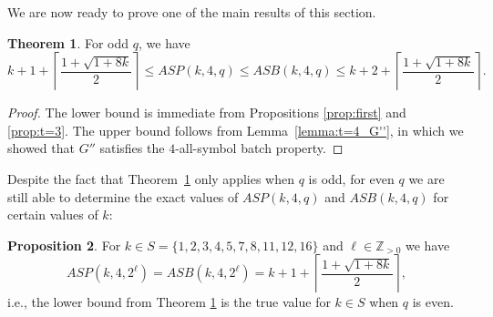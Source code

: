 \documentclass[11pt,a4paper]{article}
\theoremstyle{definition}
\newtheorem{theorem}{Theorem}
\newtheorem{proposition}[theorem]{Proposition}
\newcommand{\Z}{\mathbb{Z}}
\begin{document}
We are now ready to prove one of the main results of this section.

\begin{theorem} \label{thm:t=4} 
    For odd $q$, we have
    $$
        k+1 + \left\lceil \frac{1 + \sqrt{1 + 8k}}{2}\right\rceil \leq ASP(k,4,q) \leq ASB(k,4,q) \leq k+2 + \left\lceil \frac{1 + \sqrt{1 + 8k}}{2}\right\rceil.
    $$
\end{theorem}


\begin{proof}
    The lower bound is immediate from Propositions \ref{prop:first} and \ref{prop:t=3}. The upper bound follows from Lemma~\ref{lemma:t=4_G''}, in which we showed that \(G''\) satisfies the \(4\)-all-symbol batch property.
\end{proof}

Despite the fact that Theorem~\ref{thm:t=4} only applies when $q$ is odd, for even $q$ we are still able to determine the exact values of $ASP(k,4,q)$ and $ASB(k,4,q)$ for certain values of $k$:

\begin{proposition} \label{prop:t=4_q=2} 
    For $k \in S =\{1,2,3,4,5,7,8,11,12,16\}$ and $\ell \in \Z_{>0}$ we have 
    $$
        ASP(k,4,2^\ell)=ASB(k,4,2^\ell)= k+1 + \left\lceil \frac{1 + \sqrt{1 + 8k}}{2}\right\rceil,
    $$
    i.e., the lower bound from Theorem \ref{thm:t=4} is the true value for $k \in S$ when $q$ is even. 
\end{proposition}
\end{document}
